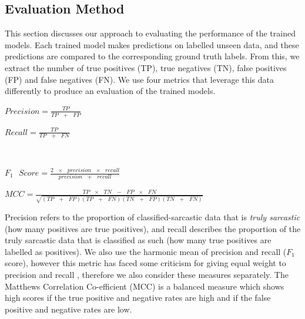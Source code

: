 \documentclass[12pt,a4paper]{article}
\begin{document}
\subsection{Evaluation Method}\vspace{-5pt}
\noindent This section discusses our approach to evaluating the performance of the trained models. Each trained model makes predictions on labelled unseen data, and these predictions are compared to the corresponding ground truth labels. From this, we extract the number of true positives (TP), true negatives (TN), false positives (FP) and false negatives (FN). We use four metrics that leverage this data differently to produce an evaluation of the trained models.\vspace{-10pt}

\hspace{-30pt}\begin{center}
	\begin{minipage}{0.47\textwidth}
		$Precision =\frac{TP}{TP\text{ } + \text{ }FP}$\\
	\end{minipage}
	\hspace{-30pt}\begin{minipage}{0.47\textwidth}
		$Recall =\frac{TP}{TP\text{ } + \text{ }FN}$\\
	\end{minipage}\\
\end{center}
\vspace{-20pt}
\begin{center}
	\begin{minipage}{0.47\textwidth}
		$F_1\text{ } Score =\frac{2 \text{ }\times\text{ } precision\text{ } \times \text{ }recall}{precision\text{ } + \text{ }recall}$
	\end{minipage}
	\hspace{-30pt}\begin{minipage}{0.47\textwidth}
		$MCC =\frac{TP \text{ } \times \text{ } TN \text{ } - \text{ } FP\text{ } \times \text{ } FN}{\sqrt{(TP \text{ } + \text{ } FP)(TP \text{ } + \text{ } FN)(TN \text{ } + \text{ } FP)(TN \text{ } + \text{ } FN)}}$
	\end{minipage}
\end{center}

\noindent Precision refers to the proportion of classified-sarcastic data that is \textit{truly sarcastic} (how many positives are true positives), and recall describes the proportion of the truly sarcastic data that is classified as such (how many true positives are labelled as positives). We also use the harmonic mean of precision and recall ($F_{1}$ score), however this metric has faced some criticism for giving equal weight to precision and recall \cite{hand2018note}, therefore we also consider these measures separately. The Matthews Correlation Co-efficient (MCC) is a balanced measure which shows high scores if the true positive and negative rates are high and if the false positive and negative rates are low.
\end{document}
